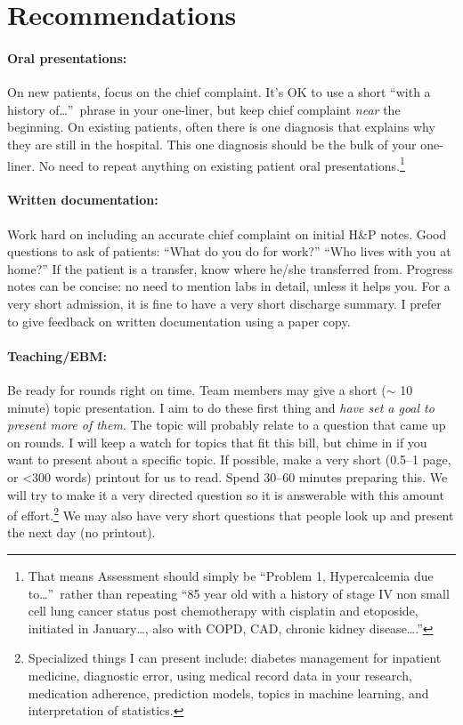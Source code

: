 \documentclass{tufte-handout}
\begin{document}
\section{Recommendations}

\paragraph{Oral presentations:} On new patients, focus on the chief
complaint. It's OK to use a short ``with a history
of\ldots{}''\ phrase in your one-liner, but keep chief complaint
\emph{near} the beginning. On existing patients, often there is one
diagnosis that explains why they are still in the hospital. This one
diagnosis should be the bulk of your one-liner. No need to repeat
anything on existing patient oral presentations.\footnote{That means
Assessment should simply be ``Problem 1, Hypercalcemia due
to\ldots{}''\ rather than repeating ``85 year old with a history of
stage IV non small cell lung cancer status post chemotherapy with
cisplatin and etoposide, initiated in January\ldots{}, also with COPD,
CAD, chronic kidney disease\ldots{}.''}

\paragraph{Written documentation:} Work hard on including an accurate chief
complaint on initial H\&P notes. Good questions to ask of patients:
``What do you do for work?'' ``Who lives with you at home?'' If the
patient is a transfer, know where he/she transferred from. Progress
notes can be concise: no need to mention labs in detail, unless it
helps you. For a very short admission, it is fine to have a very short
discharge summary. I prefer to give feedback on written documentation
using a paper copy.

\paragraph{Teaching/EBM:} Be ready for rounds right on time.
Team members may give a short ($\sim$ 10 minute) topic presentation. I
aim to do these first thing and \emph{have set a goal to present more
of them}. The topic will probably
relate to a question that came up on rounds. I will keep a watch for
topics that fit this bill, but chime in if you want to present about a
specific topic. If possible, make a very short (0.5--1 page, or <300
words) printout for us to read. Spend 30--60 minutes preparing this.
We will try to make it a very directed question so it is answerable
with this amount of effort.\footnote{Specialized things I can present
include: diabetes management for inpatient medicine, diagnostic error,
using medical record data in your research, medication adherence,
prediction models, topics in machine learning, and interpretation of
statistics.} We may also have very short questions that people look up
and present the next day (no printout).
\end{document}
